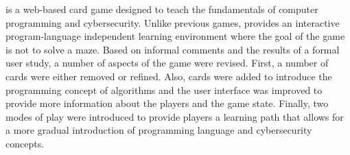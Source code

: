 \gameName is a web-based card game designed to teach the fundamentals of computer programming and cybersecurity. Unlike previous games, \gameName provides an interactive program-language independent learning environment where the goal of the game is not to solve a maze. Based on informal comments and the results of a formal user study, a number of aspects of the game were revised. First, a number of cards were either removed or refined. Also, cards were added to introduce the programming concept of algorithms and the user interface was improved to provide more information about the players and the game state. Finally, two modes of play were introduced to provide players a learning path that allows for a more gradual introduction of programming language and cybersecurity concepts.  
